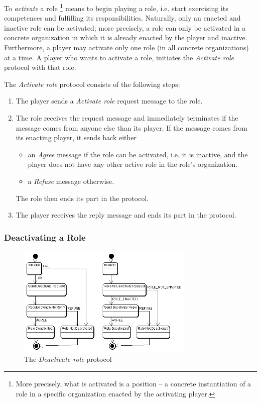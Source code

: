 To \textit{activate} a role
\footnote{More precisely, what is activated is a position -- a concrete instantiation of a role in a specific organization enacted by the activating player.}
means to begin playing a role, i.e. start exercising its competences and fulfilling its responsibilities.
Naturally, only an enacted and inactive role can be activated; more precisely, a role can only be activated in a concrete organization in which it is already enacted by the player and inactive.
Furthermore, a player may activate only one role (in all concrete organizations) at a time.
A player who wants to activate a role, initiates the \textit{Activate role} protocol with that role.

The \textit{Activate role} protocol consists of the following steps:
\begin{enumerate}
	\item The player sends a \textit{Activate role} request message to the role.
	\item The role receives the request message and immediately terminates if the message comes from anyone else than its player.
	If the message comes from its enacting player, it sends back either
	\begin{itemize}
		\item an \textit{Agree} message if the role can be activated, i.e. it is inactive, and the player does not have any other active role in the role's organization.
		\item a \textit{Refuse} message otherwise. 
	\end{itemize}
	The role then ends its part in the protocol.
	\item The player receives the reply message and ends its part in the protocol.
\end{enumerate}

\subsubsection{Deactivating a Role}

\begin{figure}[ht]
	\centering
	\includegraphics[width=0.75\textwidth]{images/thespian/deactivate-role-protocol.png}
	\caption{The \textit{Deactivate role} protocol}
	\label{figure:thespian-deactivate-role-protocol}
\end{figure}

